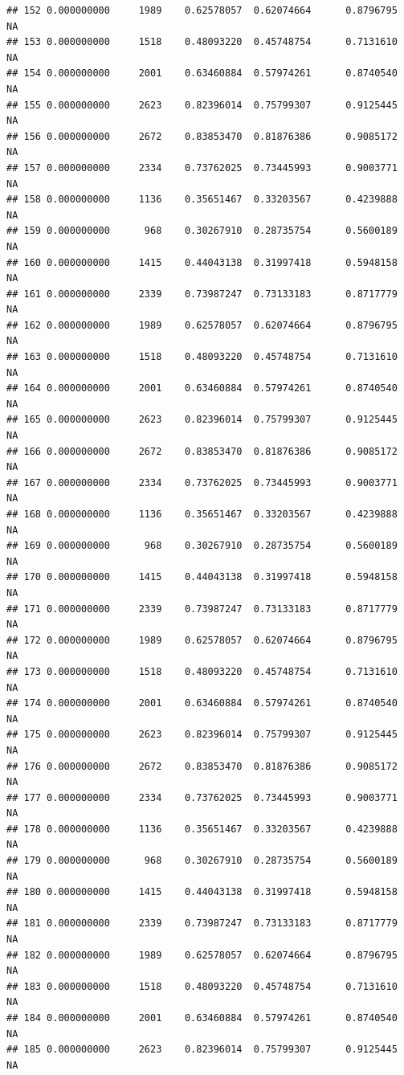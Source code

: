 \documentclass[
]{article}
\begin{document}
\begin{verbatim}
## 152 0.000000000     1989    0.62578057  0.62074664      0.8796795      NA
## 153 0.000000000     1518    0.48093220  0.45748754      0.7131610      NA
## 154 0.000000000     2001    0.63460884  0.57974261      0.8740540      NA
## 155 0.000000000     2623    0.82396014  0.75799307      0.9125445      NA
## 156 0.000000000     2672    0.83853470  0.81876386      0.9085172      NA
## 157 0.000000000     2334    0.73762025  0.73445993      0.9003771      NA
## 158 0.000000000     1136    0.35651467  0.33203567      0.4239888      NA
## 159 0.000000000      968    0.30267910  0.28735754      0.5600189      NA
## 160 0.000000000     1415    0.44043138  0.31997418      0.5948158      NA
## 161 0.000000000     2339    0.73987247  0.73133183      0.8717779      NA
## 162 0.000000000     1989    0.62578057  0.62074664      0.8796795      NA
## 163 0.000000000     1518    0.48093220  0.45748754      0.7131610      NA
## 164 0.000000000     2001    0.63460884  0.57974261      0.8740540      NA
## 165 0.000000000     2623    0.82396014  0.75799307      0.9125445      NA
## 166 0.000000000     2672    0.83853470  0.81876386      0.9085172      NA
## 167 0.000000000     2334    0.73762025  0.73445993      0.9003771      NA
## 168 0.000000000     1136    0.35651467  0.33203567      0.4239888      NA
## 169 0.000000000      968    0.30267910  0.28735754      0.5600189      NA
## 170 0.000000000     1415    0.44043138  0.31997418      0.5948158      NA
## 171 0.000000000     2339    0.73987247  0.73133183      0.8717779      NA
## 172 0.000000000     1989    0.62578057  0.62074664      0.8796795      NA
## 173 0.000000000     1518    0.48093220  0.45748754      0.7131610      NA
## 174 0.000000000     2001    0.63460884  0.57974261      0.8740540      NA
## 175 0.000000000     2623    0.82396014  0.75799307      0.9125445      NA
## 176 0.000000000     2672    0.83853470  0.81876386      0.9085172      NA
## 177 0.000000000     2334    0.73762025  0.73445993      0.9003771      NA
## 178 0.000000000     1136    0.35651467  0.33203567      0.4239888      NA
## 179 0.000000000      968    0.30267910  0.28735754      0.5600189      NA
## 180 0.000000000     1415    0.44043138  0.31997418      0.5948158      NA
## 181 0.000000000     2339    0.73987247  0.73133183      0.8717779      NA
## 182 0.000000000     1989    0.62578057  0.62074664      0.8796795      NA
## 183 0.000000000     1518    0.48093220  0.45748754      0.7131610      NA
## 184 0.000000000     2001    0.63460884  0.57974261      0.8740540      NA
## 185 0.000000000     2623    0.82396014  0.75799307      0.9125445      NA

\end{verbatim}
\end{document}
